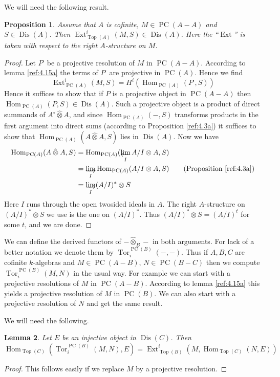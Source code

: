 \documentclass{amsproc}
\DeclareMathOperator{\Dis}{Dis}
\def\ctimes{\mathbin{\hat{\otimes}}}
\def\Ext{\operatorname {Ext}}
\def\Hom{\operatorname {Hom}}
\def\Tor{\operatorname {Tor}}
\let\oldtext\text
\def\text#1{\oldtext{\upshape #1}}
\let\invlim\projlim
\DeclareMathOperator{\PC}{PC}
\DeclareMathOperator{\Top}{Top}
\newtheorem{lemma}{Lemma}[section]
\newtheorem{proposition}[lemma]{Proposition}
\theoremstyle{definition}
\theoremstyle{remark}
\def\dirlim{\mathop{\vtop{\baselineskip -100pt\lineskip -1pt\lineskiplimit 0pt
\setbox0\hbox{\upshape lim}\copy0\hbox to \wd0{\rightarrowfill}}}\limits}
\def\invlim{\mathop{\vtop{\baselineskip -100pt\lineskip -1pt\lineskiplimit 0pt
\setbox0\hbox{\upshape lim}\copy0\hbox to \wd0{\leftarrowfill}}}\limits}
\numberwithin{equation}{section}
\numberwithin{table}{section}
\numberwithin{figure}{section}
\begin{document}
We will need the following result.
\begin{proposition}
\label{ref:4.19a}
 Assume that $A$ is cofinite, $M\in \PC(A-A)$
  and $S\in \Dis(A)$. Then 
 $\Ext^i_{\Top(A)}(M,S)\in \Dis(A)$. Here the ``$\Ext$'' is taken with
respect to the right $A$-structure on $M$.
\end{proposition}
\begin{proof} 
Let $P^\cdot$ be a projective resolution of $M$ in $\PC(A-A)$. According
to lemma \ref{ref:4.15a} the terms of $P^\cdot$ are projective in $\PC(A)$.
Hence we find
\[
\Ext^i_{\PC(A)}(M,S)=H^i(\Hom_{\PC(A)}(P^\cdot,S))
\]
Hence it suffices to show that if $P$ is a projective object in
$\PC(A-A)$  then $\Hom_{\PC(A)}(P,S)\in \Dis(A)$.  Such a projective
object is a product of direct summands of $A^\circ\ctimes A$, and since
$\Hom_{\PC(A)}(-,S)$ transforms products in the first argument into direct
sums (according to Proposition \ref{ref:4.3a}) it suffices to show that 
$\Hom_{\PC(A)}(A\ctimes A,S)$ lies in $\Dis(A)$. Now we have
\begin{align*}
\Hom_{\PC(A)}(A\ctimes A,S)&=\Hom_{\PC(A)}(\invlim_I A/I\otimes A,S)\\
&=\dirlim_I \Hom_{\PC(A)}(A/I\otimes A,S)\qquad (\text{Proposition
\ref{ref:4.3a}})\\ 
&=\dirlim_I (A/I)^\ast\otimes S
\end{align*}
Here $I$ runs through the open twosided ideals in $A$. The right
$A$-structure on $(A/I)^\ast\otimes S$ we use is the one on $(A/I)^\ast$.
Thus $(A/I)^\ast\otimes S=(A/I)^t$ for some $t$, and we are done.
\end{proof}
We can define the derived functors of $-\ctimes_{B}-$ in both 
arguments. For lack of a better notation we denote them by
$\Tor_i^{\PC(B)}(-,-)$. 
Thus if $A,B,C$ are cofinite $k$-algebras and $M\in \PC(A-B)$,
$N\in\PC(B-C)$ then we compute $\Tor^{\PC(B)}_i(M,N)$ in the  usual
way. 
For example we can start with a projective resolutions of $M$  in
$\PC(A-B)$. According to lemma  \ref{ref:4.15a}  this
yields a projective resolution of $M$ in $\PC(B)$. We can also start with
a projective resolution of $N$ and get the same result.

We will need the following.
\begin{lemma}
\label{ref:4.20a}
Let $E$ be an injective object in $\Dis(C)$. Then
\[
\Hom_{\Top(C)}(\Tor^{\PC(B)}_i(M,N),E)=\Ext^i_{\Top(B)}
(M,\Hom_{\Top(C)}(N,E))
\]
\end{lemma}
\begin{proof}
This follows easily if we replace $M$ by a projective resolution.
\end{proof}
\end{document}
